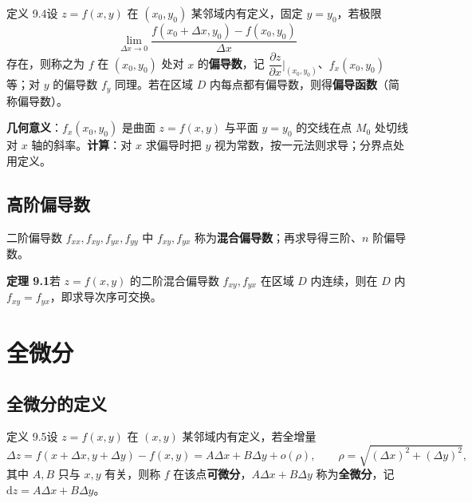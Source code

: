 定义 9.4\quad 设 $z=f(x,y)$ 在 $(x_0,y_0)$ 某邻域内有定义，固定 $y=y_0$，若极限
\begin{equation}
\lim_{\Delta x\to0}\frac{f(x_0+\Delta x,y_0)-f(x_0,y_0)}{\Delta x}
\end{equation}
存在，则称之为 $f$ 在 $(x_0,y_0)$ 处对 $x$ 的\textbf{偏导数}，记 $\dfrac{\partial z}{\partial x}\Big|_{(x_0,y_0)}$、$f_x(x_0,y_0)$ 等；对 $y$ 的偏导数 $f_y$ 同理。若在区域 $D$ 内每点都有偏导数，则得\textbf{偏导函数}（简称偏导数）。


\textbf{几何意义}：$f_x(x_0,y_0)$ 是曲面 $z=f(x,y)$ 与平面 $y=y_0$ 的交线在点 $M_0$ 处切线对 $x$ 轴的斜率。\textbf{计算}：对 $x$ 求偏导时把 $y$ 视为常数，按一元法则求导；分界点处用定义。

\subsection{高阶偏导数}

二阶偏导数 $f_{xx},f_{xy},f_{yx},f_{yy}$ 中 $f_{xy},f_{yx}$ 称为\textbf{混合偏导数}；再求导得三阶、$n$ 阶偏导数。

\textbf{定理 9.1}\quad 若 $z=f(x,y)$ 的二阶混合偏导数 $f_{xy},f_{yx}$ 在区域 $D$ 内连续，则在 $D$ 内 $f_{xy}=f_{yx}$，即求导次序可交换。


\section{全微分}

\subsection{全微分的定义}

定义 9.5\quad 设 $z=f(x,y)$ 在 $(x,y)$ 某邻域内有定义，若全增量
\begin{equation}
\Delta z=f(x+\Delta x,y+\Delta y)-f(x,y)=A\Delta x+B\Delta y+o(\rho),\qquad
\rho=\sqrt{(\Delta x)^{2}+(\Delta y)^{2}},
\end{equation}
其中 $A,B$ 只与 $x,y$ 有关，则称 $f$ 在该点\textbf{可微分}，$A\Delta x+B\Delta y$ 称为\textbf{全微分}，记 $\mathrm dz=A\Delta x+B\Delta y$。

